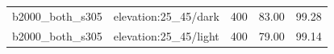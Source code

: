 \begin{longtable}{l>{\raggedright\arraybackslash}p{.42\linewidth}rrr}
b2000\_\allowbreak{}both\_\allowbreak{}s305 & %
elevation:25\_\allowbreak{}45/dark & %
400 & %
83.00 & %
99.28 \\ %

b2000\_\allowbreak{}both\_\allowbreak{}s305 & %
elevation:25\_\allowbreak{}45/light & %
400 & %
79.00 & %
99.14 \\ %


\end{longtable}
